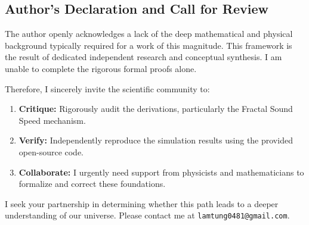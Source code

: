 \documentclass[a4paper,12pt]{article}
\begin{document}
\subsection{Author's Declaration and Call for Review}
The author openly acknowledges a lack of the deep mathematical and physical background typically required for a work of this magnitude. This framework is the result of dedicated independent research and conceptual synthesis. I am unable to complete the rigorous formal proofs alone.

Therefore, I sincerely invite the scientific community to:
\begin{enumerate}
    \item \textbf{Critique:} Rigorously audit the derivations, particularly the Fractal Sound Speed mechanism.
    \item \textbf{Verify:} Independently reproduce the simulation results using the provided open-source code.
    \item \textbf{Collaborate:} I urgently need support from physicists and mathematicians to formalize and correct these foundations.
\end{enumerate}

I seek your partnership in determining whether this path leads to a deeper understanding of our universe. Please contact me at \texttt{lamtung0481@gmail.com}.


\appendix















\end{document}
